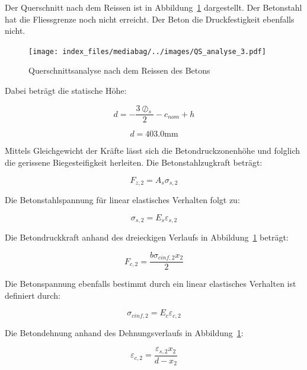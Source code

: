 \documentclass[
  letterpaper,
]{scrreprt}
\begin{document}
Der Querschnitt nach dem Reissen ist in Abbildung~\ref{fig-qs3}
dargestellt. Der Betonstahl hat die Fliessgrenze noch nicht erreicht.
Der Beton die Druckfestigkeit ebenfalls nicht.

\begin{figure}[H]

{\centering \texttt{[image: index\_files/mediabag/../images/QS\_analyse\_3.pdf]}

}

\caption{\label{fig-qs3}Querschnittsanalyse nach dem Reissen des Betons}

\end{figure}

Dabei beträgt die statische Höhe:

\begin{equation}d = - \frac{3 \oslash_{s}}{2} - c_{nom} + h\end{equation}

\begin{equation}d = 403.0 \text{mm}\end{equation}

Mittels Gleichgewicht der Kräfte lässt sich die Betondruckzonenhöhe und
folglich die gerissene Biegesteifigkeit herleiten. Die
Betonstahlzugkraft beträgt:

\begin{equation}F_{z,2} = A_{s} \sigma_{s,2}\end{equation}

Die Betonstahlspannung für linear elastisches Verhalten folgt zu:

\begin{equation}\sigma_{s,2} = E_{s} \varepsilon_{s,2}\end{equation}

Die Betondruckkraft anhand des dreieckigen Verlaufs in
Abbildung~\ref{fig-qs3} beträgt:

\begin{equation}F_{c,2} = \frac{b \sigma_{c inf,2} x_{2}}{2}\end{equation}

Die Betonspannung ebenfalls bestimmt durch ein linear elastisches
Verhalten ist definiert durch:

\begin{equation}\sigma_{c inf,2} = E_{c} \varepsilon_{c,2}\end{equation}

Die Betondehnung anhand des Dehnungsverlaufs in Abbildung~\ref{fig-qs3}:

\begin{equation}\varepsilon_{c,2} = \frac{\varepsilon_{s,2} x_{2}}{d - x_{2}}\end{equation}
\end{document}
